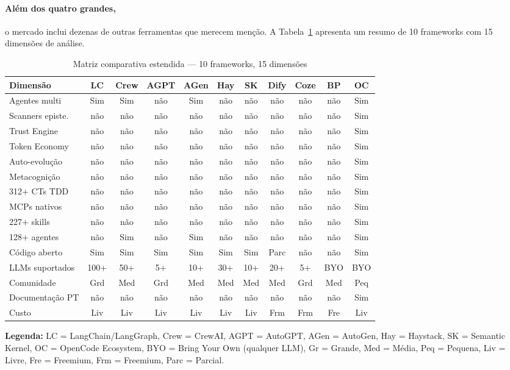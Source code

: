 \paragraph{Além dos quatro grandes,} o mercado inclui dezenas de outras
ferramentas que merecem menção. A Tabela~\ref{tab:comparacao-outros}
apresenta um resumo de 10 frameworks com 15 dimensões de análise.
\begin{table}[htb]
\centering
\caption{Matriz comparativa estendida --- 10 frameworks, 15 dimensões}
\label{tab:comparacao-outros}
\small
\begin{tabular}{lcccccccccc}
\toprule
\textbf{Dimensão} &
\textbf{LC} & \textbf{Crew} & \textbf{AGPT} & \textbf{AGen} &
\textbf{Hay} & \textbf{SK} & \textbf{Dify} &
\textbf{Coze} & \textbf{BP} & \textbf{OC} \\
\midrule
Agentes multi & Sim & Sim & não & Sim & não & não & não & não & não & Sim \\
Scanners episte. & não & não & não & não & não & não & não & não & não & Sim \\
Trust Engine & não & não & não & não & não & não & não & não & não & Sim \\
Token Economy & não & não & não & não & não & não & não & não & não & Sim \\
Auto-evolução & não & não & não & não & não & não & não & não & não & Sim \\
Metacognição & não & não & não & não & não & não & não & não & não & Sim \\
312+ CTs TDD & não & não & não & não & não & não & não & não & não & Sim \\
MCPs nativos & não & não & não & não & não & não & não & não & não & Sim \\
227+ skills & não & não & não & não & não & não & não & não & não & Sim \\
128+ agentes & não & Sim & não & Sim & não & não & não & não & não & Sim \\
Código aberto & Sim & Sim & Sim & Sim & Sim & Sim & Parc & não & não & Sim \\
LLMs suportados & 100+& 50+ & 5+ & 10+ & 30+ & 10+ & 20+ & 5+ & BYO & BYO \\
Comunidade & Grd & Med & Grd & Med & Med & Med & Med & Grd & Med & Peq \\
Documentação PT & não & não & não & não & não & não & não & não & não & Sim \\
Custo & Liv & Liv & Liv & Liv & Liv & Liv & Frm & Frm & Fre & Liv \\
\bottomrule
\end{tabular}
\end{table}
\noindent \textbf{Legenda:}
LC = LangChain/LangGraph,
Crew = CrewAI,
AGPT = AutoGPT,
AGen = AutoGen,
Hay = Haystack,
SK = Semantic Kernel,
OC = OpenCode Ecosystem,
BYO = Bring Your Own (qualquer LLM),
Gr = Grande, Med = Média, Peq = Pequena,
Liv = Livre, Fre = Freemium, Frm = Freemium,
Parc = Parcial.
